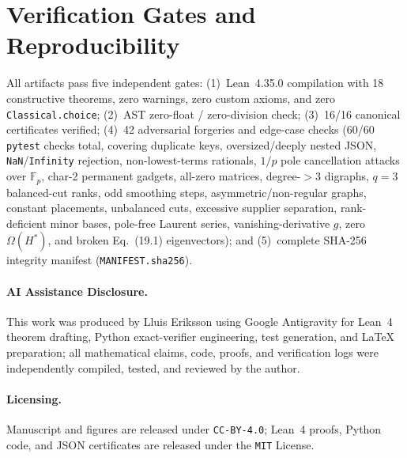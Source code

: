 \documentclass[10pt,twocolumn]{article}
\begin{document}
\section{Verification Gates and Reproducibility}
{\raggedright
All artifacts pass five independent gates: (1)~Lean~4.35.0 compilation with 18 constructive theorems, zero warnings, zero custom axioms, and zero \texttt{Classical.choice}; (2)~AST zero-float / zero-division check; (3)~16/16 canonical certificates verified; (4)~42 adversarial forgeries and edge-case checks (60/60 \texttt{pytest} checks total, covering duplicate keys, oversized/deeply nested JSON, \texttt{NaN}/\texttt{Infinity} rejection, non-lowest-terms rationals, $1/p$ pole cancellation attacks over $\mathbb{F}_p$, char-2 permanent gadgets, all-zero matrices, degree-$>3$ digraphs, $q=3$ balanced-cut ranks, odd smoothing steps, asymmetric/non-regular graphs, constant placements, unbalanced cuts, excessive supplier separation, rank-deficient minor bases, pole-free Laurent series, vanishing-derivative $g$, zero $\Omega(H^*)$, and broken Eq.~(19.1) eigenvectors); and (5)~complete SHA-256 integrity manifest (\texttt{MANIFEST.sha256}).\par}

\paragraph{AI Assistance Disclosure.}
This work was produced by Lluis Eriksson using Google Antigravity for Lean~4 theorem drafting, Python exact-verifier engineering, test generation, and \LaTeX{} preparation; all mathematical claims, code, proofs, and verification logs were independently compiled, tested, and reviewed by the author.

\paragraph{Licensing.}
Manuscript and figures are released under \texttt{CC-BY-4.0}; Lean~4 proofs, Python code, and JSON certificates are released under the \texttt{MIT} License.

{\footnotesize\raggedright


}
\end{document}
